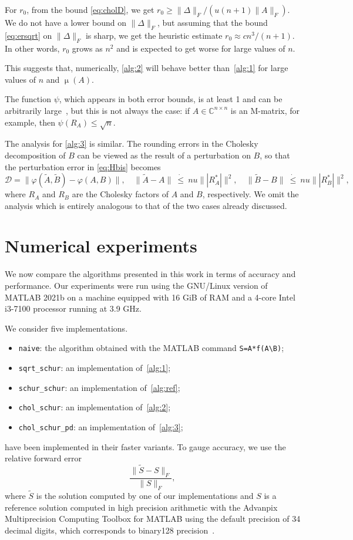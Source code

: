 \documentclass[DIV=14]{scrartcl}
\newcommand\ledot{~\dot{\le}~}
\newcommand{\C}{\ensuremath{\mathbb C}}
\newcommand{\Cnn}{\ensuremath{\C^{n \times n}}}
\theoremstyle{thmstyletwo}
\theoremstyle{definition}
\numberwithin{equation}{section}
\newcommand{\wt}{\widetilde}
\renewcommand{\Delta}{\varDelta}
\DeclareMathOperator{\cond}{\mu}
\newcommand{\algnaive}{\texttt{naive}}
\newcommand{\algss}{\texttt{sqrt\_schur}}
\newcommand{\algsc}{\texttt{chol\_schur}}
\newcommand{\algscp}{\texttt{chol\_schur\_pd}}
\newcommand{\algscsc}{\texttt{schur\_schur}}
\begin{document}
{For $r_0$, from the bound \eqref{eq:cholD},  we get $r_0\ge \|\Delta\|_F/(u(n+1)\|A\|_F)$. We do not have a lower bound on $\|\Delta\|_F$, but assuming that the bound \eqref{eq:ersqrt} on $\|\Delta\|_F$ is sharp, we get the heuristic estimate $r_0 \approx cn^3/(n+1)$. In other words, $r_0$ grows as $n^2$ and is expected to get worse for large values of $n$.

This suggests that, numerically, \cref{alg:2} will behave better than~\cref{alg:1} for large values of $n$ and $\cond(A)$.

The function $\psi$, which appears in both error bounds, is at least 1 and can be arbitrarily large~\cite[Prob.~8.2]{higham:book02}, but this is not always the case: if $A \in \Cnn$ is an M-matrix, for example, then $\psi(R_A) \le\sqrt n$.

The analysis for \cref{alg:3} is similar. The rounding errors in the Cholesky decomposition of $B$ can be viewed as the result of a perturbation on $B$, so that the perturbation error in \eqref{eq:Hbis} becomes
\[
\mathcal D=\|\varphi(\wt A,\wt B)-\varphi(A,B)\|,\quad \|\wt A-A\|\ledot nu\||R_A^*|\|^2,\quad \|\wt B-B\|\ledot nu\||R_B^*|\|^2,
\]
where $R_A$ and $R_B$ are the Cholesky factors of $A$ and $B$, respectively.
We omit the analysis which is entirely analogous to that of the two cases already discussed.



\section{Numerical experiments}
\label{sec:num-exp}

We now compare the algorithms presented in this work in terms of accuracy and performance.
Our experiments were run using the GNU/Linux version of MATLAB 2021b on a machine equipped with 16 GiB of RAM and a 4-core Intel i3-7100 processor running at 3.9 GHz.

We consider five implementations.
\begin{itemize}
    \item \algnaive: the algorithm obtained with the MATLAB command \verb|S=A*f(A\B)|;
    \item \algss: an implementation of~\cref{alg:1};
    \item \algscsc: an implementation of~\cref{alg:ref};
    \item \algsc: an implementation of~\cref{alg:2};
    \item \algscp: an implementation of~\cref{alg:3};
\end{itemize}
 have been implemented in their faster variants.
To gauge accuracy, we use the relative forward error
\begin{equation}
    \label{eq:rel-fwd-err}
    \frac{\| \wt S - S \|_F}{\| S \|_F},
\end{equation}
where $\wt S$ is the solution computed by one of our implementations and $S$ is a reference solution computed in high precision arithmetic with the Advanpix Multiprecision Computing Toolbox for MATLAB using the default precision of 34 decimal digits, which corresponds to binary128 precision~\cite{ieee19}.

}
\end{document}
